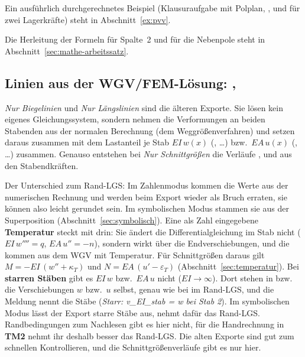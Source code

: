 Ein ausführlich durchgerechnetes Beispiel (Klausuraufgabe mit Polplan, , 
und  für zwei Lagerkräfte) steht in Abschnitt~\ref{ex:pvv}.

Die Herleitung der Formeln für Spalte~2 und für die Nebenpole steht in
Abschnitt~\ref{sec:mathe-arbeitssatz}.




\subsection{\texorpdfstring{Linien aus der WGV/FEM-Lösung: , }{Linien aus der FEM-Lösung: v\_EI\_stab, u\_EA\_stab}}\label{sec:export-fem}

\emph{Nur Biegelinien} und \emph{Nur Längslinien} sind die älteren Exporte. Sie lösen kein eigenes
Gleichungssystem, sondern nehmen die Verformungen an beiden Stabenden aus der normalen Berechnung
(dem Weggrößenverfahren) und setzen daraus zusammen mit dem Lastanteil je Stab $EI\,w(x)$
(, \dots) bzw.\ $EA\,u(x)$ (, \dots) zusammen. Genauso
entstehen bei \emph{Nur Schnittgrößen} die Verläufe ,  und
 aus den Stabendkräften.

Der Unterschied zum Rand-LGS: Im Zahlenmodus kommen die Werte aus der numerischen Rechnung und
werden beim Export wieder als Bruch erraten, sie können also leicht gerundet sein. Im symbolischen
Modus stammen sie aus der Superposition (Abschnitt~\ref{sec:symbolisch}). Eine als Zahl eingegebene
\textbf{Temperatur} steckt mit drin: Sie ändert die Differentialgleichung im Stab nicht
($EI\,w'''' = q$, $EA\,u'' = -n$), sondern wirkt über die Endverschiebungen, und die kommen aus
dem WGV mit Temperatur. Für Schnittgrößen daraus gilt $M = -EI\,(w'' + \kappa_T)$ und
$N = EA\,(u' - \varepsilon_T)$ (Abschnitt~\ref{sec:temperatur}). Bei \textbf{starren Stäben} gibt
es $EI\,w$ bzw.\ $EA\,u$ nicht ($EI \to \infty$). Dort stehen in  bzw.\
 die Verschiebungen $w$ bzw.\ $u$ selbst, genau wie bei  im Rand-LGS,
und die Meldung nennt die Stäbe (\emph{Starr: v\_EI\_stab = w bei Stab 2}). Im symbolischen Modus
lässt der Export starre Stäbe aus, nehmt dafür das Rand-LGS. Randbedingungen zum Nachlesen gibt es
hier nicht, für die Handrechnung in \textbf{TM2} nehmt ihr deshalb besser das Rand-LGS. Die alten Exporte sind gut zum schnellen
Kontrollieren, und die Schnittgrößenverläufe gibt es nur hier.

